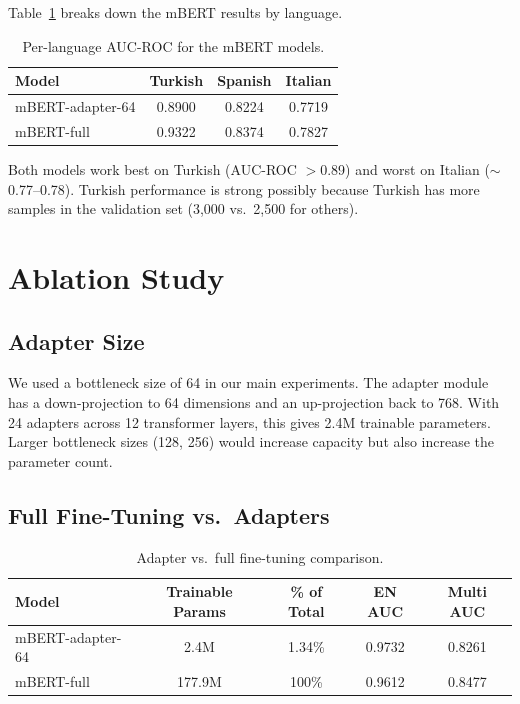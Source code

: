 \documentclass[11pt,a4paper]{article}
\begin{document}
Table~\ref{tab:perlang} breaks down the mBERT results by language.

\begin{table}[H]
\centering
\caption{Per-language AUC-ROC for the mBERT models.}
\label{tab:perlang}
\begin{tabular}{lccc}
\toprule
\textbf{Model} & \textbf{Turkish} & \textbf{Spanish} & \textbf{Italian} \\
\midrule
mBERT-adapter-64 & 0.8900 & 0.8224 & 0.7719 \\
mBERT-full        & 0.9322 & 0.8374 & 0.7827 \\
\bottomrule
\end{tabular}
\end{table}

Both models work best on Turkish (AUC-ROC $>$0.89) and worst on Italian
($\sim$0.77--0.78). Turkish performance is strong possibly because Turkish has
more samples in the validation set (3,000 vs.\ 2,500 for others).

\section{Ablation Study}

\subsection{Adapter Size}

We used a bottleneck size of 64 in our main experiments. The adapter module has
a down-projection to 64 dimensions and an up-projection back to 768. With 24
adapters across 12 transformer layers, this gives 2.4M trainable parameters.
Larger bottleneck sizes (128, 256) would increase capacity but also increase
the parameter count.

\subsection{Full Fine-Tuning vs.\ Adapters}

\begin{table}[H]
\centering
\caption{Adapter vs.\ full fine-tuning comparison.}
\label{tab:ablation}
\begin{tabular}{lcccc}
\toprule
\textbf{Model} & \textbf{Trainable Params} & \textbf{\% of Total} & \textbf{EN AUC} & \textbf{Multi AUC} \\
\midrule
mBERT-adapter-64 & 2.4M  & 1.34\%  & 0.9732 & 0.8261 \\
mBERT-full        & 177.9M & 100\%  & 0.9612 & 0.8477 \\
\bottomrule
\end{tabular}
\end{table}
\end{document}
